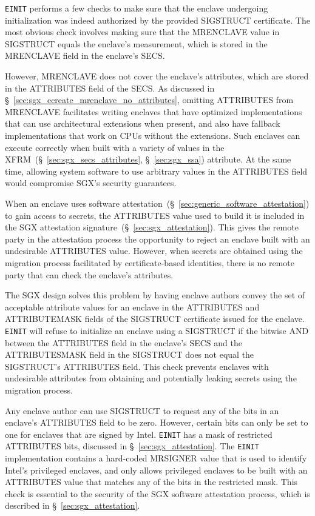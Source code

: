 \texttt{EINIT} performs a few checks to make sure that the enclave undergoing
initialization was indeed authorized by the provided SIGSTRUCT certificate. The
most obvious check involves making sure that the MRENCLAVE value in SIGSTRUCT
equals the enclave's measurement, which is stored in the MRENCLAVE field in
the enclave's SECS.


However, MRENCLAVE does not cover the enclave's attributes, which are stored in
the ATTRIBUTES field of the SECS. As discussed in
\S~\ref{sec:sgx_ecreate_mrenclave_no_attributes}, omitting ATTRIBUTES from
MRENCLAVE facilitates writing enclaves that have optimized implementations
that can use architectural extensions when present, and also have fallback
implementations that work on CPUs without the extensions. Such enclaves can
execute correctly when built with a variety of values in the
XFRM~(\S~\ref{sec:sgx_secs_attributes}, \S~\ref{sec:sgx_ssa}) attribute. At
the same time, allowing system software to use arbitrary values in the
ATTRIBUTES field would compromise SGX's security guarantees.

When an enclave uses software
attestation~(\S~\ref{sec:generic_software_attestation}) to gain access to
secrets, the ATTRIBUTES value used to build it is included in the SGX
attestation signature~(\S~\ref{sec:sgx_attestation}). This gives the remote
party in the attestation process the opportunity to reject an enclave built
with an undesirable ATTRIBUTES value. However, when secrets are obtained using
the migration process facilitated by certificate-based identities, there is no
remote party that can check the enclave's attributes.

The SGX design solves this problem by having enclave authors convey the set of
acceptable attribute values for an enclave in the ATTRIBUTES and ATTRIBUTEMASK
fields of the SIGSTRUCT certificate issued for the enclave. \texttt{EINIT} will
refuse to initialize an enclave using a SIGSTRUCT if the bitwise AND between
the ATTRIBUTES field in the enclave's SECS and the ATTRIBUTESMASK field in the
SIGSTRUCT does not equal the SIGSTRUCT's ATTRIBUTES field. This check prevents
enclaves with undesirable attributes from obtaining and potentially leaking
secrets using the migration process.

Any enclave author can use SIGSTRUCT to request any of the bits in an enclave's
ATTRIBUTES field to be zero. However, certain bits can only be set to one for
enclaves that are signed by Intel. \texttt{EINIT} has a mask of restricted
ATTRIBUTES bits, discussed in \S~\ref{sec:sgx_attestation}. The \texttt{EINIT}
implementation contains a hard-coded MRSIGNER value that is used to identify
Intel's privileged enclaves, and only allows privileged enclaves to be built
with an ATTRIBUTES value that matches any of the bits in the restricted mask.
This check is essential to the security of the SGX software attestation process,
which is described in \S~\ref{sec:sgx_attestation}.


